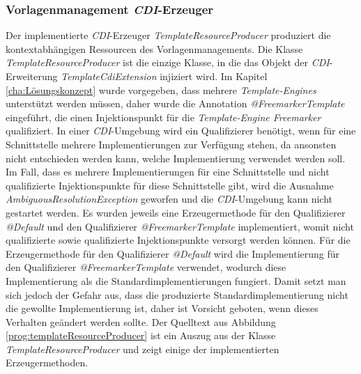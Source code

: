 \subsubsection{Vorlagenmanagement \emph{CDI}-Erzeuger}
Der implementierte \emph{CDI}-Erzeuger \emph{TemplateResourceProducer} produziert die kontextabhängigen Ressourcen des Vorlagenmanagements. Die Klasse \emph{TemplateResourceProducer} ist die einzige Klasse, in die das Objekt der \emph{CDI}-Erweiterung \emph{TemplateCdiExtension} injiziert wird. Im Kapitel \ref{cha:Lösungskonzept} wurde vorgegeben, dass mehrere \emph{Template-Engines} unterstützt werden müssen, daher wurde die Annotation \emph{@FreemarkerTemplate} eingeführt, die einen Injektionspunkt für die \emph{Template-Engine Freemarker} qualifiziert. In einer \emph{CDI}-Umgebung wird ein Qualifizierer benötigt, wenn für eine Schnittstelle mehrere Implementierungen zur Verfügung stehen, da ansonsten nicht entschieden werden kann, welche Implementierung verwendet werden soll. Im Fall, dass es mehrere Implementierungen für eine Schnittstelle und nicht qualifizierte Injektionspunkte für diese Schnittstelle gibt, wird die Ausnahme \emph{AmbiguousResolutionException} geworfen und die \emph{CDI}-Umgebung kann nicht gestartet werden. 
\newline
\newline
Es wurden jeweils eine Erzeugermethode für den Qualifizierer \emph{@Default} und den Qualifizierer \emph{@FreemarkerTemplate} implementiert, womit nicht qualifizierte sowie qualifizierte Injektionspunkte versorgt werden können. Für die Erzeugermethode für den Qualifizierer \emph{@Default} wird die Implementierung für den Qualifizierer \emph{@FreemarkerTemplate} verwendet, wodurch diese Implementierung als die Standardimplementierungen fungiert. Damit setzt man sich jedoch der Gefahr aus, dass die produzierte Standardimplementierung nicht die gewollte Implementierung ist, daher ist Vorsicht geboten, wenn dieses Verhalten geändert werden sollte. 
\newline
\newline
Der Quelltext aus Abbildung \ref{prog:templateResourceProducer} ist ein Auszug aus der Klasse \emph{TemplateResourceProducer} und zeigt einige der implementierten Erzeugermethoden. 
